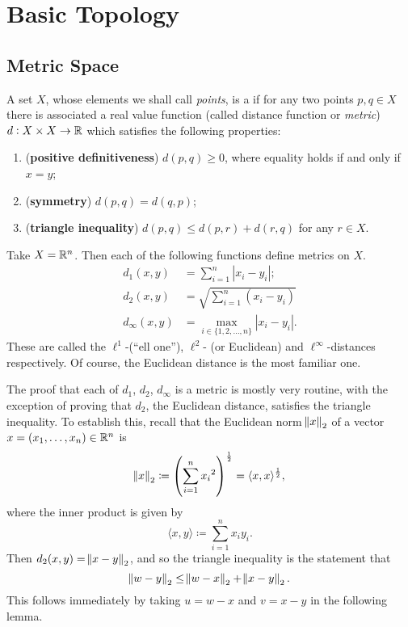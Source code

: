 \chapter{Basic Topology}
\section{Metric Space}
\begin{definition}
A set $X$, whose elements we shall call \emph{points}, is a  if for any two points $p,q\in X$ there is associated a real value function (called distance function or \emph{metric}) $d:X\times X\to\mathbb R$ which satisfies the following properties:
\begin{enumerate}[label=(\roman*)]
\item (\textbf{positive definitiveness}) $d(p,q)\ge0$, where equality holds if and only if $x=y$;
\item (\textbf{symmetry}) $d(p,q)=d(q,p)$;
\item (\textbf{triangle inequality}) $d(p,q)\le d(p,r)+d(r,q)$ for any $r\in X$.
\end{enumerate}
\end{definition}

\begin{example}
Take $X=\mathbb R^n$. Then each of the following functions define
metrics on $X$.
\begin{align*}
d_1(x,y)&=\sum_{i=1}^{n}|x_i-y_i|;\\
d_2(x,y)&=\sqrt{\sum_{i=1}^{n}(x_i-y_i)}\\
d_\infty(x,y)&=\max_{i\in\{1,2,\dots,n\}}|x_i-y_i|.
\end{align*}
These are called the $\ell^1$-(``ell one''), $\ell^2$- (or Euclidean) and $\ell^\infty$-distances respectively. Of course, the Euclidean distance is the most familiar one.
\end{example}

The proof that each of $d_1$, $d_2$, $d_\infty$ is a metric is mostly very routine, with the exception of proving that $d_2$, the Euclidean distance, satisfies the triangle inequality. To establish this, recall that the Euclidean norm $\norm{x}_2$ of a vector $x=(x_1,\dots,x_n)\in\mathbb R^n$ is
\[\norm{x}_2\coloneqq\left(\sum_{i=1}^n{x_i}^2\right)^\frac{1}{2}=\langle x,x\rangle^\frac{1}{2},\]
where the inner product is given by
\[\langle x,y\rangle\coloneqq\sum_{i=1}^{n}x_i y_i.\]
Then $d_2(x,y)=\norm{x-y}_2$, and so the triangle inequality is the statement that
\[\norm{w-y}_2\le\norm{w-x}_2+\norm{x-y}_2.\]
This follows immediately by taking $u=w-x$ and $v=x-y$ in the following lemma.

